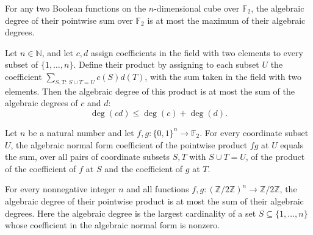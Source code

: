\begin{theorem}
\label{FABL.functionAlgebraicDegree_add_le_max}
\leanok
{}
For any two Boolean functions on the $n$-dimensional cube over $\mathbb{F}_2$, the
algebraic degree of their pointwise sum over $\mathbb{F}_2$ is at most the maximum of
their algebraic degrees.
\end{theorem}

\begin{theorem}
\label{FABL.algebraicDegree_anfMul_le_add}
\leanok
{}
Let $n\in\mathbb N$, and let $c,d$ assign coefficients in the field with two elements to
every subset of $\{1,\ldots,n\}$. Define their product by assigning to each subset $U$
the coefficient $\sum_{S,T:\,S\cup T=U}c(S)d(T)$, with the sum taken in the field with
two elements. Then the algebraic degree of this product is at most the sum of the
algebraic degrees of $c$ and $d$:
\[
\deg(cd)\le\deg(c)+\deg(d).
\]
\end{theorem}

\begin{theorem}
\label{FABL.anfCoeff_mul}
\leanok
{}
Let $n$ be a natural number and let $f,g:\{0,1\}^n\to\mathbb F_2$. For every coordinate
subset $U$, the algebraic normal form coefficient of the pointwise product $fg$ at $U$
equals the sum, over all pairs of coordinate subsets $S,T$ with $S\cup T=U$, of the
product of the coefficient of $f$ at $S$ and the coefficient of $g$ at $T$.
\end{theorem}

\begin{theorem}
\label{FABL.functionAlgebraicDegree_mul_le_add}
\leanok
{}
For every nonnegative integer $n$ and all functions
$f,g:(\mathbb{Z}/2\mathbb{Z})^n\to\mathbb{Z}/2\mathbb{Z}$, the algebraic degree of their
pointwise product is at most the sum of their algebraic degrees. Here the algebraic
degree is the largest cardinality of a set $S\subseteq\{1,\ldots,n\}$ whose coefficient
in the algebraic normal form is nonzero.
\end{theorem}

